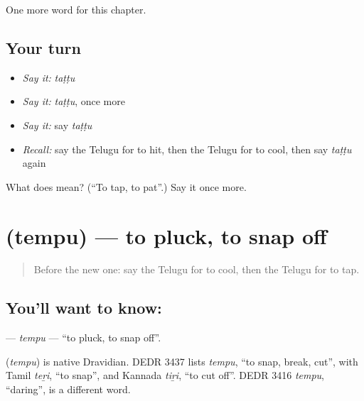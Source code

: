 \begin{grammarlens}[title={What you've built}]
One more word for this chapter.
\end{grammarlens}

\subsection*{Your turn}
\begin{itemize}
\raggedright
  \item \emph{Say it:} \emph{taṭṭu}
  \item \emph{Say it:} \emph{taṭṭu}, once more
  \item \emph{Say it:} say \emph{taṭṭu}
  \item \emph{Recall:} say the Telugu for to hit, then the Telugu for to cool, then say \emph{taṭṭu} again
\end{itemize}

\begin{tcolorbox}[breakable,colback=teal!4,colframe=teal!35!black,title={Before you move on}]
What does  mean? (\textquotedblleft{}To tap, to pat\textquotedblright{}.) Say it once more.
\end{tcolorbox}
\section[\texorpdfstring{\te{తెంపు} (tempu)}{తెంపు (tempu)}]{ (tempu) — to pluck, to snap off}

\label{lesson:TE-C207-tempu}



\begin{quote}
Before the new one: say the Telugu for to cool, then the Telugu for to tap.
\end{quote}

\subsection*{You'll want to know: }
\textbf{} — \emph{tempu} — \textquotedblleft{}to pluck, to snap off\textquotedblright{}.

\begin{cousinweb}
\textbf{} (\emph{tempu}) is native Dravidian. DEDR 3437 lists \emph{tempu}, \textquotedblleft{}to snap, break, cut\textquotedblright{}, with Tamil \emph{teṟi}, \textquotedblleft{}to snap\textquotedblright{}, and Kannada \emph{tiṟi}, \textquotedblleft{}to cut off\textquotedblright{}. DEDR 3416 \emph{tempu}, \textquotedblleft{}daring\textquotedblright{}, is a different word.
\end{cousinweb}

